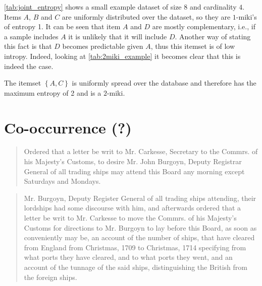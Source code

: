 \cref{tab:joint_entropy} shows a small example dataset of size $8$ and cardinality $4$. Items $A$, $B$ and $C$ are uniformly distributed over the dataset, so they are $1$-miki's of entropy \num{1}.
It can be seen that item $A$ and $D$ are mostly complementary, i.e., if a sample includes $A$ it is unlikely that it will include $D$.
Another way of stating this fact is that $D$ becomes predictable given $A$, thus this itemset is of low intropy.
Indeed, looking at \cref{tab:2miki_example} it becomes clear that this is indeed the case.

The itemset $\left\{ A, C \right\}$ is uniformly spread over the database and therefore has the maximum entropy of \num{2} and is a $2$-miki.




\section{Co-occurrence (?)}
\label{sec:co-occurrence}

\begin{quote}
    Ordered that a letter be writ to Mr. Carkesse, Secretary to the Commrs. of his Majesty's Customs, to desire Mr. John Burgoyn, Deputy Registrar General of all trading ships may attend this Board any morning except Saturdays and Mondays.
\end{quote}

\begin{quote}
    Mr. Burgoyn, Deputy Register General of all trading ships attending, their lordships had some discourse with him, and afterwards ordered that a letter be writ to Mr. Carkesse to move the Commrs. of his Majesty's Customs for directions to Mr. Burgoyn to lay before this Board, as soon as conveniently may be, an account of the number of ships, that have cleared from England from Christmas, 1709 to Christmas, 1714 specifying from what ports they have cleared, and to what ports they went, and an account of the tunnage of the said ships, distinguishing the British from the foreign ships.
\end{quote}